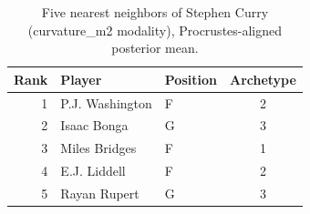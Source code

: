 \begin{table}[htbp]
  \centering\small
  \begin{tabular}{rllc}
    \toprule
    Rank & Player & Position & Archetype \\
    \midrule
    1 & P.J. Washington & F & 2 \\
    2 & Isaac Bonga & G & 3 \\
    3 & Miles Bridges & F & 1 \\
    4 & E.J. Liddell & F & 2 \\
    5 & Rayan Rupert & G & 3 \\
    \bottomrule
  \end{tabular}
  \caption{Five nearest neighbors of Stephen Curry (curvature_m2 modality), Procrustes-aligned posterior mean.}
  \label{tab:Stephen_Curry_neighbors_curvature_m2}
\end{table}

